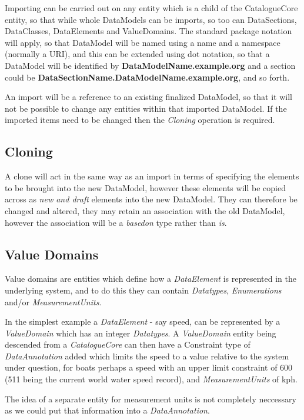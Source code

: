 \documentclass{article}
\begin{document}
Importing can be carried out on any entity which is a child of the CatalogueCore entity, so that while whole DataModels can be imports, so too can DataSections, DataClasses, DataElements and ValueDomains. The standard package notation will apply, so that DataModel will be named using a name and a namespace (normally a URI), and this can be extended using dot notation, so that a DataModel will be identified by \textbf{DataModelName.example.org} and a section could be \textbf{DataSectionName.DataModelName.example.org}, and so forth.

An import will be a reference to an existing finalized DataModel, so that it will not be possible to change any entities within that imported DataModel. If the imported items need to be changed then the \emph{Cloning} operation is required.

\subsection{Cloning}

A clone will act in the same way as an import in terms of specifying the elements to be brought into the new DataModel, however these elements will be copied across as \emph{new and draft} elements into the new DataModel. They can therefore be changed and altered, they may retain an association with the old DataModel, however the association will be a \emph{basedon} type rather than \emph{is}. 



\subsection{Value Domains}

Value domains are entities which define how a \emph{DataElement} is represented in the underlying system, and to do this they can contain \emph{Datatypes}, \emph{Enumerations} and/or \emph{MeasurementUnits}. 

In the simplest example a \emph{DataElement} - say speed, can be represented by a \emph{ValueDomain} which has an integer \emph{Datatypes}. A  \emph{ValueDomain} entity being descended from a \emph{CatalogueCore} can then have a Constraint type of \emph{DataAnnotation} added which limits the speed to a value relative to the system under question, for boats perhaps a speed with an upper limit constraint of 600 (511 being the current world water speed record), and \emph{MeasurementUnits} of kph. 

The idea of a separate entity for measurement units is not completely neccessary as we could put that information into a \emph{DataAnnotation}.
\end{document}
